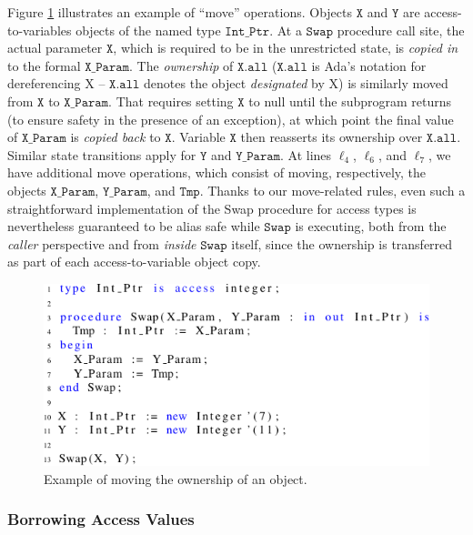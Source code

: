 \documentclass{llncs}
\newcommand\var[1]{\ensuremath{\mathtt{#1}}}
\begin{document}
Figure \ref{fig:move_ex1} illustrates an example of ``move'' operations. Objects \var{X} and \var{Y} are access-to-variables objects of the named type \var{Int\_Ptr}. At a \var{Swap} procedure call site,
the actual parameter \var{X}, which is required to be in the unrestricted state, is \textit{copied in} to the formal \var{X\_Param}. The \textit{ownership} of \var{X.all} (\var{X.all} is Ada's notation for dereferencing X -- \var{X.all} denotes the object \textit{designated} by X) is similarly moved from \var{X} to \var{X\_Param}.
That requires setting \var{X} to null until the subprogram returns (to ensure safety in the presence of an exception), at which point the final value of \var{X\_Param} is \textit{copied back} to \var{X}.
Variable \var{X} then reasserts its ownership over \var{X.all}. Similar state transitions apply for \var{Y} and \var{Y\_Param}.  At lines $\ell_4$, $\ell_6$, and $\ell_7$,
we have additional move operations, which consist of moving, respectively, the objects \var{X\_Param}, \var{Y\_Param}, and \var{Tmp}. Thanks to our move-related rules, even such a straightforward
implementation of the Swap procedure for access types is nevertheless guaranteed to be alias safe while \var{Swap} is executing, both from the \textit{caller} perspective and from \textit{inside} \var{Swap} itself, since the ownership is transferred
as part of each access-to-variable object copy.

\begin{figure}[htb!]
\centering
   \includegraphics[]{move_ex1}
   \caption{Example of moving the ownership of an object.}
   \label{fig:move_ex1}
\end{figure}

\subsubsection{Borrowing Access Values}
\label{sec:borrowing}
\end{document}
